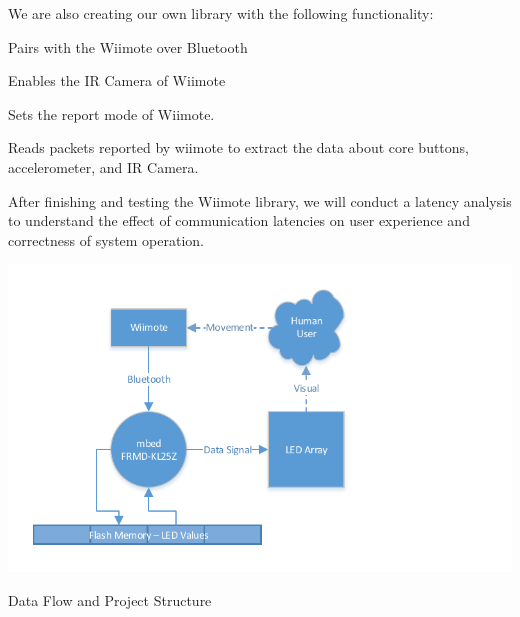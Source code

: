 \documentclass{tufte-handout}
\begin{document}
We are also creating our own library with the
following functionality:
\begin{enumerate*}
    \item Pairs with the Wiimote over Bluetooth
    \item Enables the IR Camera of Wiimote
    \item Sets the report mode of Wiimote.
    \item Reads packets reported by wiimote to extract the data about core buttons, accelerometer, and IR Camera.
\end{enumerate*}
After finishing and testing the Wiimote library, we will conduct a latency
analysis to understand the effect of communication latencies on user
experience and correctness of system operation.
\begin{marginfigure}
    \includegraphics[trim=1cm 0cm 4cm 0cm, width=\linewidth]{dataflow.pdf}
    \caption{Data Flow and Project Structure}
\end{marginfigure}
\end{document}
